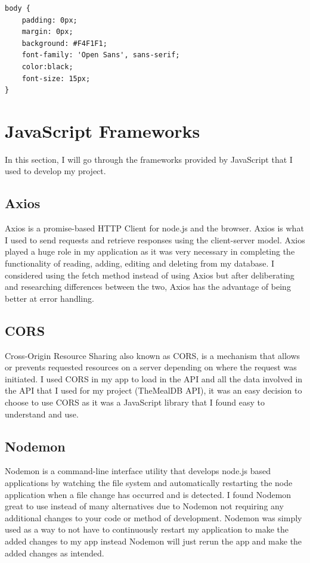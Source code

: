 \begin{verbatim}
body {
    padding: 0px;
    margin: 0px;
    background: #F4F1F1;
    font-family: 'Open Sans', sans-serif;
    color:black;
    font-size: 15px;
}
\end{verbatim}

\section{JavaScript Frameworks}

In this section, I will go through the frameworks provided by JavaScript that I used to develop my project.

\subsection{Axios}

Axios is a promise-based HTTP Client for node.js and the browser. Axios is what I used to send requests and retrieve responses using the client-server model. Axios played a huge role in my application as it was very necessary in completing the functionality of reading, adding, editing and deleting from my database. I considered using the fetch method instead of using Axios but after deliberating  and researching differences between the two, Axios has the advantage of being better at error handling.

\subsection{CORS}

Cross-Origin Resource Sharing also known as CORS, is a mechanism that allows or prevents requested resources on a server depending on where the request was initiated. I used CORS in my app to load in the API and all the data involved in the API that I used for my project (TheMealDB API), it was an easy decision to choose to use CORS as it was a JavaScript library that I found easy to understand and use.

\subsection{Nodemon}

Nodemon is a command-line interface utility that develops node.js based applications by watching the file system and automatically restarting the node application when a file change has occurred and is detected. I found Nodemon great to use instead of many alternatives due to Nodemon not requiring any additional changes to your code or method of development. Nodemon was simply used as a way to not have to continuously restart my application to make the added changes to my app instead Nodemon will just rerun the app and make the added changes as intended.

